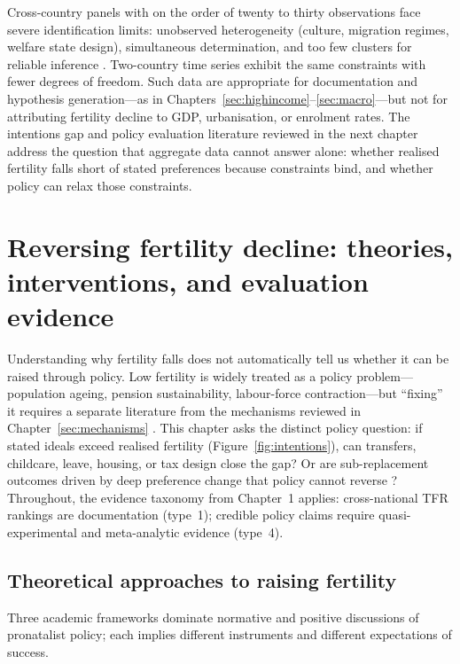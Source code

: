 \documentclass[11pt,a4paper,openany]{book}
\begin{document}
Cross-country panels with on the order of twenty to thirty observations face severe identification limits: unobserved heterogeneity (culture, migration regimes, welfare state design), simultaneous determination, and too few clusters for reliable inference \citep{myrskyla2009}. Two-country time series exhibit the same constraints with fewer degrees of freedom. Such data are appropriate for documentation and hypothesis generation---as in Chapters~\ref{sec:highincome}--\ref{sec:macro}---but not for attributing fertility decline to GDP, urbanisation, or enrolment rates. The intentions gap and policy evaluation literature reviewed in the next chapter address the question that aggregate data cannot answer alone: whether realised fertility falls short of stated preferences because constraints bind, and whether policy can relax those constraints.

\FloatBarrier
\chapter[Reversing fertility decline]{Reversing fertility decline: theories, interventions, and evaluation evidence}
\label{sec:reversal}

Understanding why fertility falls does not automatically tell us whether it can be raised through policy. Low fertility is widely treated as a policy problem---population ageing, pension sustainability, labour-force contraction---but ``fixing'' it requires a separate literature from the mechanisms reviewed in Chapter~\ref{sec:mechanisms} \citep{morgan2003,mcdonald2006,frejkajones2010}. This chapter asks the distinct policy question: if stated ideals exceed realised fertility (Figure~\ref{fig:intentions}), can transfers, childcare, leave, housing, or tax design close the gap? Or are sub-replacement outcomes driven by deep preference change that policy cannot reverse \citep{lesthaeghe2010}? Throughout, the evidence taxonomy from Chapter~1 applies: cross-national TFR rankings are documentation (type~1); credible policy claims require quasi-experimental and meta-analytic evidence (type~4).

\section{Theoretical approaches to raising fertility}

Three academic frameworks dominate normative and positive discussions of pronatalist policy; each implies different instruments and different expectations of success.
\end{document}
